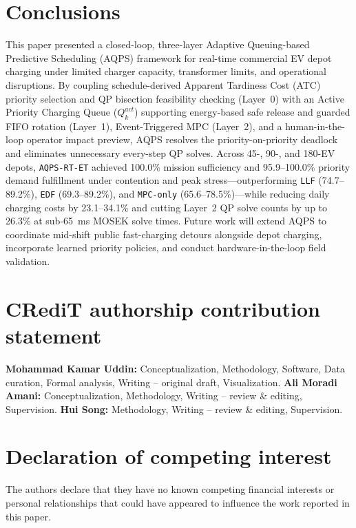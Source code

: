 \documentclass[final,3p,times,twocolumn]{elsarticle}
\begin{document}
\section{Conclusions}
\label{sec:conclusion}

This paper presented a closed-loop, three-layer Adaptive Queuing-based Predictive Scheduling (AQPS) framework for real-time commercial EV depot charging under limited charger capacity, transformer limits, and operational disruptions. By coupling schedule-derived Apparent Tardiness Cost (ATC) priority selection and QP bisection feasibility checking (Layer~0) with an Active Priority Charging Queue ($Q_k^{act}$) supporting energy-based safe release and guarded FIFO rotation (Layer~1), Event-Triggered MPC (Layer~2), and a human-in-the-loop operator impact preview, AQPS resolves the priority-on-priority deadlock and eliminates unnecessary every-step QP solves. Across 45-, 90-, and 180-EV depots, \texttt{AQPS-RT-ET} achieved 100.0\% mission sufficiency and 95.9--100.0\% priority demand fulfillment under contention and peak stress---outperforming \texttt{LLF} (74.7--89.2\%), \texttt{EDF} (69.3--89.2\%), and \texttt{MPC-only} (65.6--78.5\%)---while reducing daily charging costs by 23.1--34.1\% and cutting Layer~2 QP solve counts by up to 26.3\% at sub-65~ms MOSEK solve times. Future work will extend AQPS to coordinate mid-shift public fast-charging detours alongside depot charging, incorporate learned priority policies, and conduct hardware-in-the-loop field validation.

\section*{CRediT authorship contribution statement}
\textbf{Mohammad Kamar Uddin:} Conceptualization, Methodology, Software, Data curation, Formal analysis, Writing -- original draft, Visualization. \textbf{Ali Moradi Amani:} Conceptualization, Methodology, Writing -- review \& editing, Supervision. \textbf{Hui Song:} Methodology, Writing -- review \& editing, Supervision.

\section*{Declaration of competing interest}
The authors declare that they have no known competing financial interests or personal relationships that could have appeared to influence the work reported in this paper.



\end{document}
